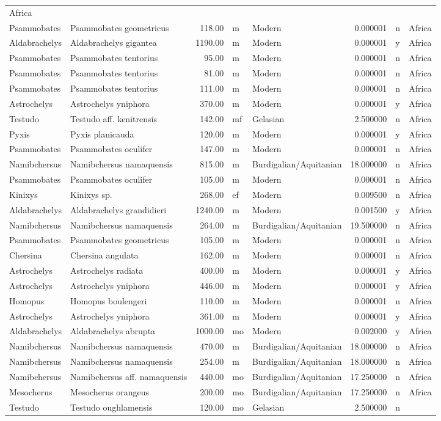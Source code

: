 \documentclass[]{article}
\begin{document}
\begin{longtable}[]{@{}llrllrll@{}}
Africa\tabularnewline
Psammobates & Psammobates geometricus & 118.00 & m & Modern & 0.000001 &
n & Africa\tabularnewline
Aldabrachelys & Aldabrachelys gigantea & 1190.00 & m & Modern & 0.000001
& y & Africa\tabularnewline
Psammobates & Psammobates tentorius & 95.00 & m & Modern & 0.000001 & n
& Africa\tabularnewline
Psammobates & Psammobates tentorius & 81.00 & m & Modern & 0.000001 & n
& Africa\tabularnewline
Psammobates & Psammobates tentorius & 111.00 & m & Modern & 0.000001 & n
& Africa\tabularnewline
Astrochelys & Astrochelys yniphora & 370.00 & m & Modern & 0.000001 & y
& Africa\tabularnewline
Testudo & Testudo aff. kenitrensis & 142.00 & mf & Gelasian & 2.500000 &
n & Africa\tabularnewline
Pyxis & Pyxis planicauda & 120.00 & m & Modern & 0.000001 & y &
Africa\tabularnewline
Psammobates & Psammobates oculifer & 147.00 & m & Modern & 0.000001 & n
& Africa\tabularnewline
Namibchersus & Namibchersus namaquensis & 815.00 & m &
Burdigalian/Aquitanian & 18.000000 & n & Africa\tabularnewline
Psammobates & Psammobates oculifer & 105.00 & m & Modern & 0.000001 & n
& Africa\tabularnewline
Kinixys & Kinixys sp. & 268.00 & ef & Modern & 0.009500 & n &
Africa\tabularnewline
Aldabrachelys & Aldabrachelys grandidieri & 1240.00 & m & Modern &
0.001500 & y & Africa\tabularnewline
Namibchersus & Namibchersus namaquensis & 264.00 & m &
Burdigalian/Aquitanian & 19.500000 & n & Africa\tabularnewline
Psammobates & Psammobates geometricus & 105.00 & m & Modern & 0.000001 &
n & Africa\tabularnewline
Chersina & Chersina angulata & 162.00 & m & Modern & 0.000001 & n &
Africa\tabularnewline
Astrochelys & Astrochelys radiata & 400.00 & m & Modern & 0.000001 & y &
Africa\tabularnewline
Astrochelys & Astrochelys yniphora & 446.00 & m & Modern & 0.000001 & y
& Africa\tabularnewline
Homopus & Homopus boulengeri & 110.00 & m & Modern & 0.000001 & n &
Africa\tabularnewline
Astrochelys & Astrochelys yniphora & 361.00 & m & Modern & 0.000001 & y
& Africa\tabularnewline
Aldabrachelys & Aldabrachelys abrupta & 1000.00 & mo & Modern & 0.002000
& y & Africa\tabularnewline
Namibchersus & Namibchersus namaquensis & 470.00 & m &
Burdigalian/Aquitanian & 18.000000 & n & Africa\tabularnewline
Namibchersus & Namibchersus namaquensis & 254.00 & m &
Burdigalian/Aquitanian & 18.000000 & n & Africa\tabularnewline
Namibchersus & Namibchersus aff. namaquensis & 440.00 & mo &
Burdigalian/Aquitanian & 17.250000 & n & Africa\tabularnewline
Mesocherus & Mesocherus orangeus & 200.00 & mo & Burdigalian/Aquitanian
& 17.250000 & n & Africa\tabularnewline
Testudo & Testudo oughlamensis & 120.00 & mo & Gelasian & 2.500000 & n &

\end{longtable}
\end{document}
